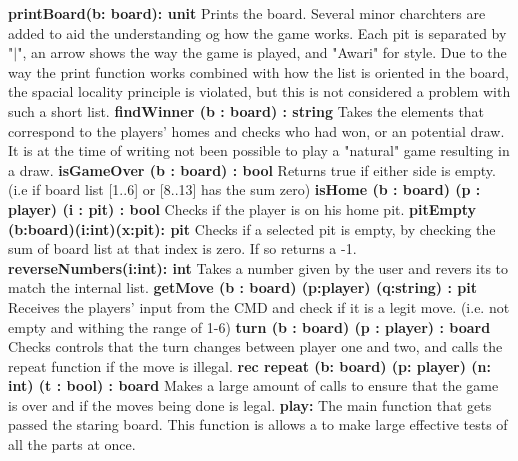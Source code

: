 \documentclass{article}
\begin{document}
         \textbf{ printBoard(b: board): unit }\newline
         Prints the board. Several minor charchters are added to aid the understanding og how the game works. Each pit is separated by "$|$", an arrow shows the way the game is played, and "Awari" for style. Due to the way the print function works combined with how the list is oriented in the board, the spacial locality principle is violated, but this is not considered a problem with such a short list.\newline 
         \textbf{ findWinner (b : board) : string }\newline
        Takes the elements that correspond to the players' homes and checks who had won, or an potential draw. It is at the time of writing not been possible to play a "natural" game resulting in a draw. \newline
         \textbf{ isGameOver (b : board) : bool }\newline
        Returns true if either side is empty. (i.e if board list [1..6] or [8..13] has the sum zero)\newline
         \textbf{ isHome (b : board) (p : player) (i : pit) : bool }\newline
            Checks if the player is on his home pit.\newline
         \textbf{ pitEmpty (b:board)(i:int)(x:pit): pit }\newline
Checks if a selected pit is empty, by checking the sum of board list at that index is zero. If so returns a -1.\newline
         \textbf{ reverseNumbers(i:int): int }\newline
Takes a number given by the user and revers its to match the internal list. \newline
         \textbf{ getMove (b : board) (p:player) (q:string) : pit }\newline
            Receives the players' input from the CMD and check if it is a legit move. (i.e. not empty and withing the range of 1-6)\newline
         \textbf{ turn (b : board) (p : player) : board}\newline
           	 Checks controls that the turn changes between player one and two, and calls the repeat function if the move is illegal. \newline
         \textbf{ rec repeat (b: board) (p: player) (n: int) (t : bool) : board}\newline
Makes a large amount of calls to ensure that the game is over and if the moves being done is legal.\newline
        \textbf{play:}\newline
        The main function that gets passed the staring board. This function is allows a to make large effective tests of all the parts at once. \newline
         
\end{document}
